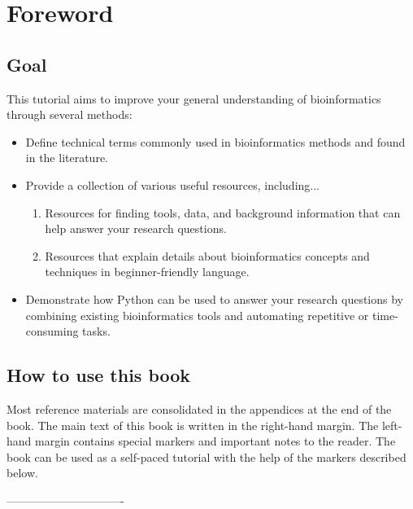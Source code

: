 \maketitle 
\listoftodos
\tableofcontents %

\chapter{Foreword}

\section{Goal}
This tutorial aims to improve your general understanding of bioinformatics through several methods:
\begin{itemize}
    \item Define technical terms commonly used in bioinformatics methods and found in the literature.
    \item Provide a collection of various useful resources, including...
    \begin{enumerate}
        \item Resources for finding tools, data, and background information that can help answer your research questions.
        \item Resources that explain details about bioinformatics concepts and techniques in beginner-friendly language.
    \end{enumerate}
    \item Demonstrate how Python can be used to answer your research questions by combining existing bioinformatics tools and automating repetitive or time-consuming tasks.
\end{itemize}

\section{How to use this book}
Most reference materials are consolidated in the appendices at the end of the book. The main text of this book is written in the right-hand margin. The left-hand margin contains special markers and important notes to the reader. The book can be used as a self-paced tutorial with the help of the markers described below.

------------------------------- 

